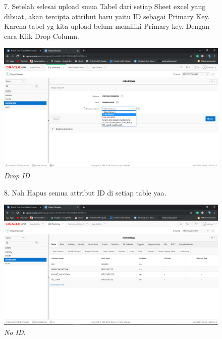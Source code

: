 \begin{enumerate}
    \begin{figure}[!htbp]
    \item[7.] Setelah selesai upload smua Tabel dari setiap Sheet excel yang dibuat, akan tercipta attribut baru yaitu ID sebagai Primary Key. Karena tabel yg kita upload belum memiliki Primary key. Dengan cara Klik Drop Column.
    \begin{center}
    \includegraphics[scale=0.3]{figures/Screenshot(123).png}
    \caption{\textit{Drop ID.}}
    \end{center}   
    \end{figure}
    
    \begin{figure}[!htbp]
    \item[8.] Nah Hapus semua attribut ID di setiap table yaa.
    \begin{center}
    \includegraphics[scale=0.3]{figures/Screenshot(124).png}
    \caption{\textit{No ID.}}
    \end{center}   
    \end{figure}
    

\end{enumerate}
